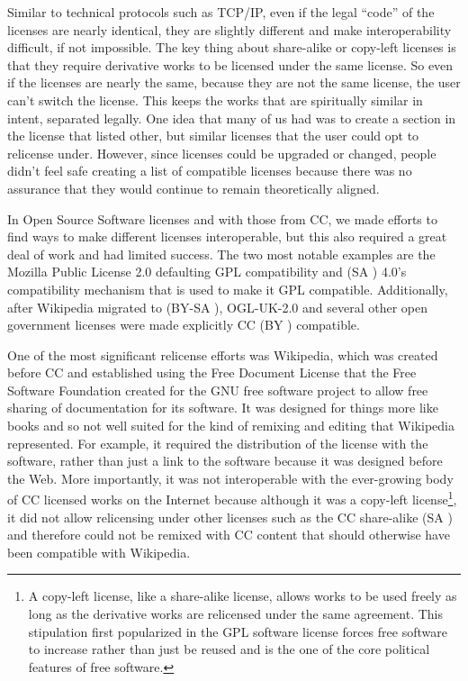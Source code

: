 Similar to technical protocols such as \ac{TCP/IP}, even if the legal ``code'' of the licenses are nearly identical, they are slightly different and make interoperability difficult, if not impossible. The key thing about share-alike or copy-left licenses is that they require derivative works to be licensed under the same license. So even if the licenses are nearly the same, because they are not the same license, the user can't switch the license. This keeps the works that are spiritually similar in intent, separated legally. One idea that many of us had was to create a section in the license that listed other, but similar licenses that the user could opt to relicense under. However, since licenses could be upgraded or changed, people didn't feel safe creating a list of compatible licenses because there was no assurance that they would continue to remain theoretically aligned.


In Open Source Software licenses and with those from \ac{CC}, we made efforts to find ways to make different licenses interoperable, but this also required a great deal of work and had limited success. The two most notable examples are the Mozilla Public License 2.0 defaulting \ac{GPL} compatibility and (SA \ccShareAlike) 4.0's compatibility mechanism that is used to make it \ac{GPL} compatible. Additionally, after Wikipedia migrated to (BY-SA \ccbysa), OGL-UK-2.0 and several other open government licenses were made explicitly \ac{CC} (BY \ccby) compatible.

One of the most significant relicense efforts was Wikipedia, which was created before \ac{CC} and established using the Free Document License that the Free Software Foundation created for the GNU free software project to allow free sharing of documentation for its software. It was designed for things more like books and so not well suited for the kind of remixing and editing that Wikipedia represented. For example, it required the distribution of the license with the software, rather than just a link to the software because it was designed before the Web. More importantly, it was not interoperable with the ever-growing body of \ac{CC} licensed works on the Internet because although it was a copy-left license\footnote{A copy-left license, like a share-alike license, allows works to be used freely as long as the derivative works are relicensed under the same agreement. This stipulation first popularized in the GPL software license forces free software to increase rather than just be reused and is the one of the core political features of free software.}, it did not allow relicensing under other licenses such as the \ac{CC} share-alike (SA \ccShareAlike) and therefore could not be remixed with \ac{CC} content that should otherwise have been compatible with Wikipedia.


